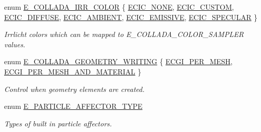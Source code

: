 \begin{DoxyCompactItemize}
\item 
enum \hyperlink{namespaceirr_1_1scene_a61cba210038d6d843b81d9282f1cac7e}{E\+\_\+\+C\+O\+L\+L\+A\+D\+A\+\_\+\+I\+R\+R\+\_\+\+C\+O\+L\+OR} \{ \newline
\hyperlink{namespaceirr_1_1scene_a61cba210038d6d843b81d9282f1cac7ea46a948a882be4d21af671d4dff939a12}{E\+C\+I\+C\+\_\+\+N\+O\+NE}, 
\hyperlink{namespaceirr_1_1scene_a61cba210038d6d843b81d9282f1cac7eae1ff98b61069652418cc36e411de863c}{E\+C\+I\+C\+\_\+\+C\+U\+S\+T\+OM}, 
\hyperlink{namespaceirr_1_1scene_a61cba210038d6d843b81d9282f1cac7eac230a09c9fc579cc1776baea37731329}{E\+C\+I\+C\+\_\+\+D\+I\+F\+F\+U\+SE}, 
\hyperlink{namespaceirr_1_1scene_a61cba210038d6d843b81d9282f1cac7ea1508a71bf85cb6f1303df8ae240cde75}{E\+C\+I\+C\+\_\+\+A\+M\+B\+I\+E\+NT}, 
\newline
\hyperlink{namespaceirr_1_1scene_a61cba210038d6d843b81d9282f1cac7ea212908c2b2af576861553e4b441ac7f3}{E\+C\+I\+C\+\_\+\+E\+M\+I\+S\+S\+I\+VE}, 
\hyperlink{namespaceirr_1_1scene_a61cba210038d6d843b81d9282f1cac7eae62f9539794fa526128ea1eed9840b7d}{E\+C\+I\+C\+\_\+\+S\+P\+E\+C\+U\+L\+AR}
 \}\begin{DoxyCompactList}\small\item\em Irrlicht colors which can be mapped to E\+\_\+\+C\+O\+L\+L\+A\+D\+A\+\_\+\+C\+O\+L\+O\+R\+\_\+\+S\+A\+M\+P\+L\+ER values. \end{DoxyCompactList}
\item 
enum \hyperlink{namespaceirr_1_1scene_a179008e7c02889459edf81394dbd6959}{E\+\_\+\+C\+O\+L\+L\+A\+D\+A\+\_\+\+G\+E\+O\+M\+E\+T\+R\+Y\+\_\+\+W\+R\+I\+T\+I\+NG} \{ \hyperlink{namespaceirr_1_1scene_a179008e7c02889459edf81394dbd6959a48f7ed09f68367a679cc8f6d4fd63906}{E\+C\+G\+I\+\_\+\+P\+E\+R\+\_\+\+M\+E\+SH}, 
\hyperlink{namespaceirr_1_1scene_a179008e7c02889459edf81394dbd6959af2b6f3248808f3dbf81a7e707e508f65}{E\+C\+G\+I\+\_\+\+P\+E\+R\+\_\+\+M\+E\+S\+H\+\_\+\+A\+N\+D\+\_\+\+M\+A\+T\+E\+R\+I\+AL}
 \}\begin{DoxyCompactList}\small\item\em Control when geometry elements are created. \end{DoxyCompactList}
\item 
\mbox{\label{namespaceirr_1_1scene_a34c0f9475cfcbda8b50ad816a046010b}} 
enum \hyperlink{namespaceirr_1_1scene_a34c0f9475cfcbda8b50ad816a046010b}{E\+\_\+\+P\+A\+R\+T\+I\+C\+L\+E\+\_\+\+A\+F\+F\+E\+C\+T\+O\+R\+\_\+\+T\+Y\+PE} \begin{DoxyCompactList}\small\item\em Types of built in particle affectors. \end{DoxyCompactList}

\end{DoxyCompactItemize}
